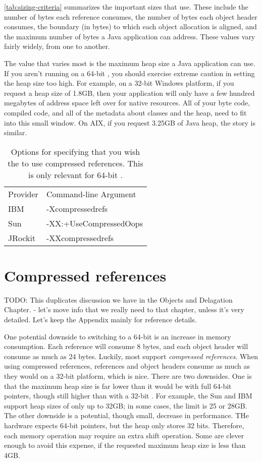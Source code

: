 \autoref{tab:sizing-criteria} summarizes the important sizes that \jres use.
These include the number of bytes each reference consumes, the number of bytes
each object header consumes, the boundary (in bytes) to which each object
allocation is aligned, and the maximum number of bytes a Java application can
address. These values vary fairly widely, from one \jre to another. 

The value that varies most is the maximum heap size a Java application can use.
If you aren't running on a 64-bit \jre, you should exercise extreme caution in
setting the heap size too high. For example, on a 32-bit Windows platform, if
you request a heap size of 1.8GB, then your application will only have a few
hundred megabytes  of address space left over for native resources. All of your
byte code, compiled code, and all of the \jres metadata about classes and the
heap, need to fit into this small window. On AIX, if you request 3.25GB of Java
heap, the story is similar.

\begin{wraptable}{r}{0.5\textwidth}
\centering
\begin{tabular}{ll}
\toprule
Provider & Command-line Argument \\
\cmidrule(r){1-1} \cmidrule(r){2-2}
IBM & -Xcompressedrefs \\
Sun & -XX:+UseCompressedOops \\
JRockit & -XXcompressedrefs \\
\bottomrule
\end{tabular}
\caption{Options for specifying that you wish the \jre to use compressed references. This is only relevant for 64-bit \jres.}
\end{wraptable}

\section{Compressed references}

TODO: This duplicates discussion we have in the Objects and Delagation Chapter.
- let's move info that we really need to that chapter, unless it's very
detailed.  Let's keep the Appendix mainly for reference details.


 One potential downside to switching to a 64-bit \jre is an increase
in memory consumption. Each reference will consume 8 bytes, and each object header will
consume as much as 24 bytes. Luckily, most \jres support \emph{compressed
references}. When using compressed references, references and object headers
consume as much as they would on a 32-bit platform, which is nice. There are two
downsides. One is that the maximum heap size is far lower than it would be with
full 64-bit pointers, though still higher than with a 32-bit \jre. For example,
the Sun and IBM \javasix \jres support heap sizes of only up to 32GB; in some
cases, the limit is 25 or 28GB. The other downside is a potential, though small,
decrease in performance. THe hardware expects 64-bit pointers, but the heap only
stores 32 bits. Therefore, each memory operation may require an extra shift
operation. Some \jres are clever enough to avoid this expense, if the requested
maximum heap size is less than 4GB.


